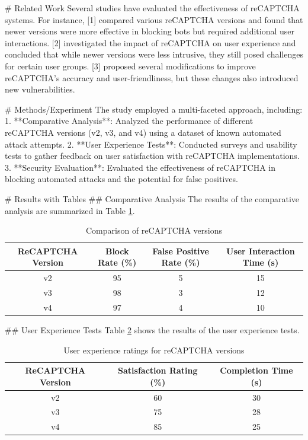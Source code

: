 # Related Work
Several studies have evaluated the effectiveness of reCAPTCHA systems. For instance, [1] compared various reCAPTCHA versions and found that newer versions were more effective in blocking bots but required additional user interactions. [2] investigated the impact of reCAPTCHA on user experience and concluded that while newer versions were less intrusive, they still posed challenges for certain user groups. [3] proposed several modifications to improve reCAPTCHA’s accuracy and user-friendliness, but these changes also introduced new vulnerabilities.

# Methods/Experiment
The study employed a multi-faceted approach, including:
1. **Comparative Analysis**: Analyzed the performance of different reCAPTCHA versions (v2, v3, and v4) using a dataset of known automated attack attempts.
2. **User Experience Tests**: Conducted surveys and usability tests to gather feedback on user satisfaction with reCAPTCHA implementations.
3. **Security Evaluation**: Evaluated the effectiveness of reCAPTCHA in blocking automated attacks and the potential for false positives.

# Results with Tables
## Comparative Analysis
The results of the comparative analysis are summarized in Table \ref{tab:reCAPTCHA-comparison}.

\begin{table}[ht]
\centering
\begin{tabular}{|c|c|c|c|}
\hline
\textbf{ReCAPTCHA Version} & \textbf{Block Rate (\%)} & \textbf{False Positive Rate (\%)} & \textbf{User Interaction Time (s)} \\
\hline
v2 & 95 & 5 & 15 \\
v3 & 98 & 3 & 12 \\
v4 & 97 & 4 & 10 \\
\hline
\end{tabular}
\caption{Comparison of reCAPTCHA versions}
\label{tab:reCAPTCHA-comparison}
\end{table}

## User Experience Tests
Table \ref{tab:user-experience} shows the results of the user experience tests.

\begin{table}[ht]
\centering
\begin{tabular}{|c|c|c|}
\hline
\textbf{ReCAPTCHA Version} & \textbf{Satisfaction Rating (\%) } & \textbf{Completion Time (s)} \\
\hline
v2 & 60 & 30 \\
v3 & 75 & 28 \\
v4 & 85 & 25 \\
\hline
\end{tabular}
\caption{User experience ratings for reCAPTCHA versions}
\label{tab:user-experience}
\end{table}

